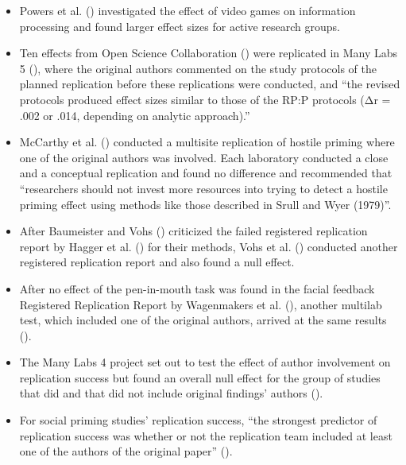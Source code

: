 \documentclass[
  letterpaper,
  DIV=11,
  openany,
  fontsize=12pt,
  parskip=half,
  headings=big,
  numbers=noenddot,
  titlepage=false]{scrreprt}
\begin{document}
\begin{itemize}
\item
  Powers et al. () investigated the
  effect of video games on information processing and found larger
  effect sizes for active research groups.
\item
  Ten effects from Open Science Collaboration
  () were replicated in Many
  Labs 5 (), where
  the original authors commented on the study protocols of the planned
  replication before these replications were conducted, and ``the
  revised protocols produced effect sizes similar to those of the RP:P
  protocols (Δr = .002 or .014, depending on analytic approach).''
\item
  McCarthy et al. () conducted a
  multisite replication of hostile priming where one of the original
  authors was involved. Each laboratory conducted a close and a
  conceptual replication and found no difference and recommended that
  ``researchers should not invest more resources into trying to detect a
  hostile priming effect using methods like those described in Srull and
  Wyer (1979)''.
\item
  After Baumeister and Vohs ()
  criticized the failed registered replication report by Hagger et al.
  () for their methods, Vohs et al.
  () conducted another registered
  replication report and also found a null effect.
\item
  After no effect of the pen-in-mouth task was found in the facial
  feedback Registered Replication Report by Wagenmakers et al.
  (), another multilab test,
  which included one of the original authors, arrived at the same
  results ().
\item
  The Many Labs 4 project set out to test the effect of author
  involvement on replication success but found an overall null effect
  for the group of studies that did and that did not include original
  findings' authors ().
\item
  For social priming studies' replication success, ``the strongest
  predictor of replication success was whether or not the replication
  team included at least one of the authors of the original paper''
  ().
\end{itemize}
\end{document}
